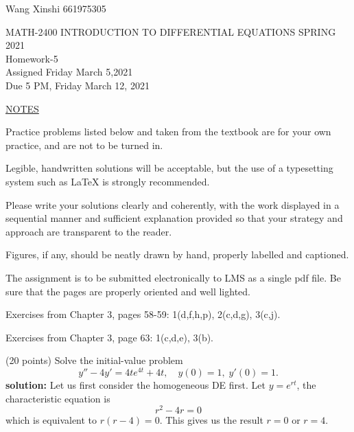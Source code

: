 
\pagestyle{empty}

Wang Xinshi 661975305
\begin{center}
\large{ MATH-2400 \hspace{.25in}  INTRODUCTION TO DIFFERENTIAL EQUATIONS \hspace{.25in}SPRING 2021\\ Homework-5  \\ Assigned Friday March 5,2021 \\ Due 5 PM, Friday March 12, 2021}\end{center}

\bigskip
\n\ul{NOTES}
\benum
\item 
Practice problems listed below and taken from the textbook are for your own practice, and are not to be turned in.
\item 
Legible, handwritten solutions will be acceptable, but the use of a typesetting system such as LaTeX is strongly recommended.  \nc
\item 
Please write your solutions clearly and coherently, with the work displayed in a sequential manner and sufficient explanation provided so that your strategy and approach are transparent to the reader. 
\item 
Figures, if any, should be neatly drawn by hand, properly labelled and captioned.  
\item 
The assignment is to be submitted electronically to LMS  as a single pdf file.  Be sure that the pages are properly oriented and well lighted.  \nc
\eenum

\bigskip


 \ec

\n Exercises from Chapter 3, pages 58-59: 1(d,f,h,p), 2(c,d,g), 3(c,j).

\n Exercises from Chapter 3, page 63: 1(c,d,e), 3(b).

\medskip

 \ec

\benum


\item (20 points) Solve the initial-value problem
\begin{equation*}
y''-4y' = 4te^{4t} + 4t, \quad y(0)=1, \; y'(0)=1.
\end{equation*}
\textbf{solution:} Let us first consider the homogeneous DE first. Let $y = e^{rt}$, the characteristic equation is $$r^2-4r = 0$$
which is equivalent to $r(r-4) = 0$. This gives us the result $r = 0$ or $r = 4$.

